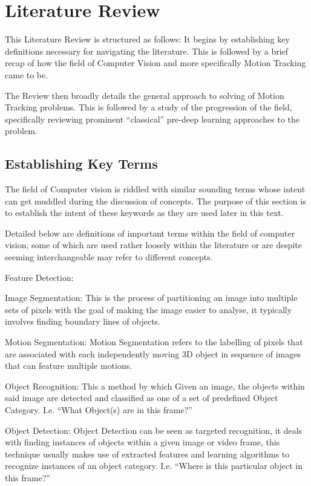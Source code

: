 \chapter{Literature Review}\label{literature_review}

This Literature Review is structured as follows: It begins by establishing key
definitions necessary for navigating the literature. This is followed by a brief
recap of how the field of Computer Vision and more specifically Motion Tracking
came to be.

The Review then broadly details the general approach to solving of Motion Tracking
problems. This is followed by a study of the progression of the field,
specifically reviewing prominent “classical” pre-deep learning approaches to the
problem.

\section{Establishing Key Terms}
The field of Computer vision is riddled with similar sounding terms whose intent
can get muddled during the discussion of concepts.  The purpose of this section
is to establish the intent of these keywords as they are used later in this text.

Detailed below are definitions of important terms within the field of computer
vision, some of which are used rather loosely within the literature or are
despite seeming interchangeable may refer to different concepts. 

Feature Detection:

Image Segmentation: This is the process of partitioning an image into multiple
sets of pixels with the goal of making the image easier to analyse, it typically
involves finding boundary lines of objects. 

Motion Segmentation: Motion Segmentation refers to the labelling of pixels that
are associated with each independently moving 3D object in sequence of images
that can feature multiple motions.~\cite{Tekalp2014}

Object Recognition: This a method by which Given an image, the objects within
said image are detected and classified as one of a set of predefined Object
Category.  I.e. “What Object(s) are in this frame?”

Object Detection: Object Detection can be seen as targeted recognition, it deals
with finding instances of objects within a given image or video frame, this
technique usually makes use of extracted features and learning algorithms to
recognize instances of an object category.  I.e. “Where is this particular
object in this frame?”

